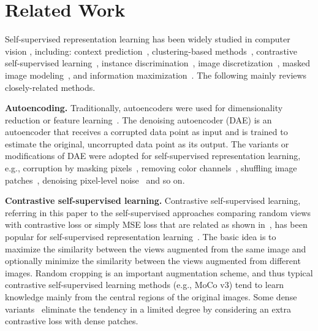 \documentclass[twocolumn]{svjour3}          \smartqed  \usepackage{graphicx}
\begin{document}
\section{Related Work}
Self-supervised representation learning
has been widely studied 
in computer vision
, including:
context prediction~\cite{CarlDoersch2015UnsupervisedVR,tian2021semantic},
clustering-based methods~\cite{xie2016unsupervised,yang2016joint,caron2018deep,asano2019self,zhuang2019local,huang2019unsupervised,caron2019unsupervised,PriyaGoyal2021SelfsupervisedPO},
contrastive self-supervised learning~\cite{li2020prototypical,AaronvandenOord2018RepresentationLW,henaff2020data,wang2022repre},
instance discrimination~\cite{dosovitskiy2014discriminative,dosovitskiy2015discriminative},
image discretization~\cite{gidaris2020learning,gidaris2020online},
masked image modeling~\cite{li2021mst,fang2022corrupted,tian2022beyond},
and information maximization~\cite{ermolov2021whitening,zbontar2021barlow,bardes2021vicreg}.
The following mainly reviews closely-related methods.


\vspace{1mm}
\noindent\textbf{Autoencoding.}
Traditionally, autoencoders were used for dimensionality reduction or feature learning~\cite{phdthesis_LeCun,gallinari1987memoires,hinton1994autoencoders,hinton2006reducing,ranzato2007efficient,vincent2008extracting,kingma2013auto}.
The denoising autoencoder (DAE) is an autoencoder that receives a corrupted data point as input and is trained to estimate the original, uncorrupted data point as its output.
The variants or modifications
of DAE were adopted
for self-supervised representation learning,
e.g., corruption by masking pixels~\cite{VincentLLBM10,pathak2016context,chen2020generative},
removing color channels~\cite{zhang2016colorful},
shuffling image patches~\cite{noroozi2016unsupervised}, denoising pixel-level noise~\cite{atito2021sit}
and so on.

\vspace{1mm}
\noindent\textbf{Contrastive self-supervised learning.}
Contrastive self-supervised learning,
referring 
in this paper
to the self-supervised approaches
comparing random views
with contrastive loss
or simply MSE loss
that are related
as shown in~\cite{GarridoCBNL22},
has been popular
for self-supervised representation learning~\cite{ChenK0H20,He0WXG20,YonglongTian2020WhatMF,ChenXH21,grill2020bootstrap,CaronTMJMBJ21,chen2021exploring,caron2020unsupervised_swav,wu2018unsupervised,XiangyuPeng2022CraftingBC}.
The basic idea is to 
maximize the similarity
between the views augmented
from the same image
and optionally minimize
the similarity
between the views
augmented from different images.
Random cropping
is an important augmentation scheme,
and thus
typical contrastive self-supervised learning methods 
(e.g., MoCo v3) tend to learn knowledge
mainly from the central regions of the original images.
Some dense variants~\cite{wang2021dense,xie2021propagate} 
eliminate the tendency 
in a limited degree
by
considering an extra contrastive loss
with dense patches.
\end{document}
